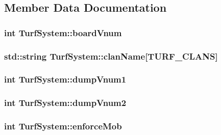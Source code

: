 \subsection{Member Data Documentation}
\hypertarget{classTurfSystem_aa073cc7f204f5a1e60e495f3086eaa02}{
\subsubsection[{board\-Vnum}]{\setlength{\rightskip}{0pt plus 5cm}int Turf\-System\-::board\-Vnum}}\label{classTurfSystem_aa073cc7f204f5a1e60e495f3086eaa02}
\hypertarget{classTurfSystem_a2cef1b445a81d345ccae67689fe2f7ab}{
\subsubsection[{clan\-Name}]{\setlength{\rightskip}{0pt plus 5cm}std\-::string Turf\-System\-::clan\-Name\mbox{[}{\bf T\-U\-R\-F\-\_\-\-C\-L\-A\-N\-S}\mbox{]}}}\label{classTurfSystem_a2cef1b445a81d345ccae67689fe2f7ab}
\hypertarget{classTurfSystem_ab110656e923b1e05ceff952b9a53e006}{
\subsubsection[{dump\-Vnum1}]{\setlength{\rightskip}{0pt plus 5cm}int Turf\-System\-::dump\-Vnum1}}\label{classTurfSystem_ab110656e923b1e05ceff952b9a53e006}
\hypertarget{classTurfSystem_a6bdfdb3fc68c426054cc3f632249345c}{
\subsubsection[{dump\-Vnum2}]{\setlength{\rightskip}{0pt plus 5cm}int Turf\-System\-::dump\-Vnum2}}\label{classTurfSystem_a6bdfdb3fc68c426054cc3f632249345c}
\hypertarget{classTurfSystem_a3161f2d2bd6af42575f033a73681cb0e}{
\subsubsection[{enforce\-Mob}]{\setlength{\rightskip}{0pt plus 5cm}int Turf\-System\-::enforce\-Mob}}\label{classTurfSystem_a3161f2d2bd6af42575f033a73681cb0e}
